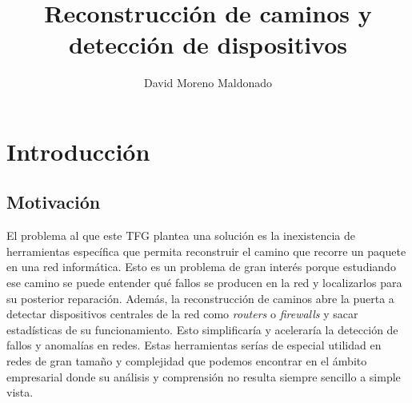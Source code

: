 \documentclass[tfg,epsbased,lof,lot,loa,final,nocopyright,overleaf]{tfgtfmthesisuam}
\title{Reconstrucción de caminos y detección de dispositivos}
\author{David Moreno Maldonado}
\begin{document}
\chapter{Introducción}

\section{Motivación}
El problema al que este TFG plantea una solución es la inexistencia de herramientas específica que permita reconstruir el camino que recorre un paquete en una red informática. Esto es un problema de gran interés porque estudiando ese camino se puede entender qué fallos se producen en la red y localizarlos para su posterior reparación. Además, la reconstrucción de caminos abre la puerta a detectar dispositivos centrales de la red como \textit{routers} o \textit{firewalls} y sacar estadísticas de su funcionamiento. Esto simplificaría y aceleraría la detección de fallos y anomalías en redes. Estas herramientas serías de especial utilidad en redes de gran tamaño y complejidad que podemos encontrar en el ámbito empresarial donde su análisis y comprensión no resulta siempre sencillo a simple vista.
\end{document}
